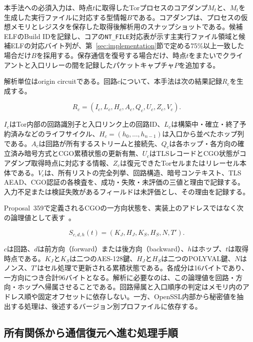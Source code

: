\documentclass[10pt,a4paper]{ltjsarticle}
\newcommand{\code}[1]{\nolinkurl{#1}}
\begin{document}
本手法への必須入力は、時点$t$に取得したTorプロセスのコアダンプ$M_t$と、$M_t$を生成した実行ファイルに対応する型情報$B$である。コアダンプは、プロセスの仮想メモリとレジスタを保存した取得後解析用のスナップショットである。候補ELFのBuild IDを記録し、コアの\code{NT_FILE}対応表が示す主実行ファイル領域と候補ELFの対応バイト列が、第~\ref{sec:implementation}節で定める75\%以上一致した場合だけ$B$を採用する。保存通信を復号する場合だけ、時点$t$をまたいでクライアントと入口リレーの間を記録したパケットキャプチャ$P$を追加する。

解析単位はorigin circuitである。回路$c$について、本手法は次の結果記録$R_c$を生成する。

\begin{equation}
R_c=(I_c,L_c,H_c,A_c,Q_c,U_c,Z_c,V_c).
\label{eq:result-record}
\end{equation}

$I_c$はTor内部の回路識別子と入口リンク上の回路ID、$L_c$は構築中・確立・終了予約済みなどのライフサイクル、$H_c=(h_0,\ldots,h_{n-1})$は入口から並べたホップ列である。$A_c$は回路が所有するストリームと接続先、$Q_c$は各ホップ・各方向の確立済み暗号方式とCGO累積状態の更新有無、$U_c$はTLSレコードとCGO状態がコアダンプ取得時点に対応する情報、$Z_c$は復元できたTorセルまたはリレーセル本体である。$V_c$は、所有リストの完全列挙、回路構造、暗号コンテキスト、TLS AEAD、CGO認証の各検査を、成功・失敗・未評価の三値と理由で記録する。入力不足または検証失敗があるフィールドは未評価とし、その理由を記録する。

Proposal~359で定義されるCGOの一方向状態を、実装上のアドレスではなく次の論理値として表す~\cite{torproposal359}。

\begin{equation}
S_{c,d,h}(t)=(K_J,H_J,K_S,H_S,N,T').
\label{eq:cgo-state}
\end{equation}

$c$は回路、$d$は前方向（forward）または後方向（backward）、$h$はホップ、$t$は取得時点である。$K_J$と$K_S$は二つのAES-128鍵、$H_J$と$H_S$は二つのPOLYVAL鍵、$N$はノンス、$T'$はセル処理で更新される累積状態である。各成分は16バイトであり、一方向につき合計96バイトとなる。解析に必要なのは、この論理値を回路・方向・ホップへ帰属させることである。回路帰属と入口順序の判定はメモリ内のアドレス順や固定オフセットに依存しない。一方、OpenSSL内部から秘密値を抽出する処理は、後述するバージョン別プロファイルに依存する。

\subsection{所有関係から通信復元へ進む処理手順}
\end{document}
